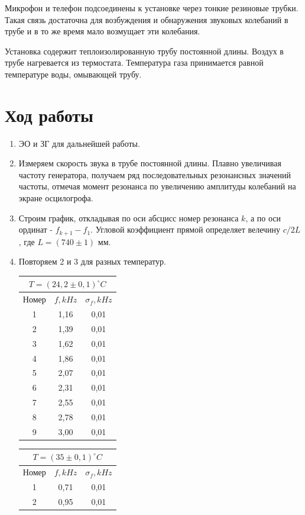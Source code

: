 \documentclass[a4paper, 12pt]{article}%
\begin{document}
Микрофон и телефон подсоединены к установке через тонкие резиновые трубки. Такая связь достаточна для возбуждения и обнаружения звуковых колебаний в трубе и в то же время мало возмущает эти колебания.

Установка содержит теплоизолированную трубу постоянной длины. Воздух в трубе нагревается из термостата. Температура газа принимается равной температуре воды, омывающей трубу.  
\section*{Ход работы}
\begin{enumerate}
\item  ЭО и ЗГ для дальнейшей работы.
\item Измеряем скорость звука в трубе постоянной длины. Плавно увеличивая частоту генератора, получаем ряд последовательных резонансных значений частоты, отмечая момент резонанса по увеличению амплитуды колебаний на экране осцилогрофа.
\item Строим график, откладывая по оси абсцисс номер резонанса $k$, а по оси ординат - $f_{k+1} - f_1$. Угловой коэффициент прямой определяет велечину $c / 2L$, где $L = (740 \pm 1)$ мм.
\item Повторяем 2 и 3 для разных температур.\\
\begin{tabular}{|c|c|c|}
\hline
\multicolumn{3}{|c|}{$T = (24,2 \pm 0,1) ^{\circ}C$} \\ \hline
Номер & $f, kHz$ & $\sigma_f, kHz$ \\ \hline
1 & 1,16 & 0,01 \\ \hline
2 & 1,39 & 0,01 \\ \hline
3 & 1,62 & 0,01 \\ \hline
4 & 1,86 & 0,01 \\ \hline
5 & 2,07 & 0,01 \\ \hline
6 & 2,31 & 0,01 \\ \hline
7 & 2,55 & 0,01 \\ \hline
8 & 2,78 & 0,01 \\ \hline
9 & 3,00 & 0,01 \\ \hline
\end{tabular}
\begin{tabular}{|c|c|c|}
\hline
\multicolumn{3}{|c|}{$T = (35 \pm 0,1) ^{\circ}C$} \\ \hline
Номер & $f, kHz$ & $\sigma_f, kHz$ \\ \hline
1 & 0,71 & 0,01 \\ \hline
2 & 0,95 & 0,01 \\ \hline

\end{tabular}
\end{enumerate}
\end{document}
